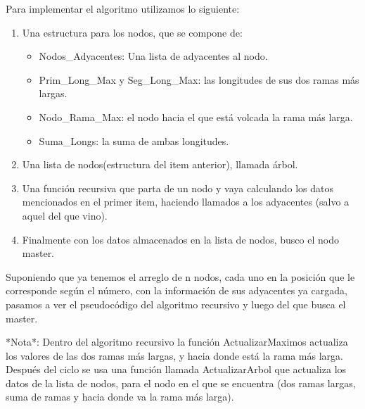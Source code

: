 Para implementar el algoritmo utilizamos lo siguiente:
\begin{enumerate}
\item Una estructura para los nodos, que se compone de:


\begin{itemize}
\item Nodos\_Adyacentes: Una lista de adyacentes al nodo.
\item Prim\_Long\_Max y Seg\_Long\_Max: las longitudes de sus dos ramas más largas. 
\item Nodo\_Rama\_Max: el nodo hacia el que está volcada la rama más larga. 
\item Suma\_Longs: la suma de ambas longitudes.
\end{itemize}



\item Una lista de nodos(estructura del item anterior), llamada árbol.
\item Una función recursiva que parta de un nodo y vaya calculando los datos mencionados en el primer item, haciendo llamados a los adyacentes (salvo a aquel del que vino).
\item Finalmente con los datos almacenados en la lista de nodos, busco el nodo master.
\end{enumerate}

 Suponiendo que ya tenemos el arreglo de n nodos, cada uno en la posición que le corresponde según el número, con la información de sus adyacentes ya cargada, pasamos a ver el pseudocódigo del algoritmo recursivo y luego del que busca el master.

 *Nota*: Dentro del algoritmo recursivo la función ActualizarMaximos actualiza los valores de las dos ramas más largas, y hacia donde está la rama más larga.
 Después del ciclo se usa una función llamada ActualizarArbol que actualiza los datos de la lista de nodos, para el nodo en el que se encuentra (dos ramas largas, suma de ramas y hacia donde va la rama más larga).
 
